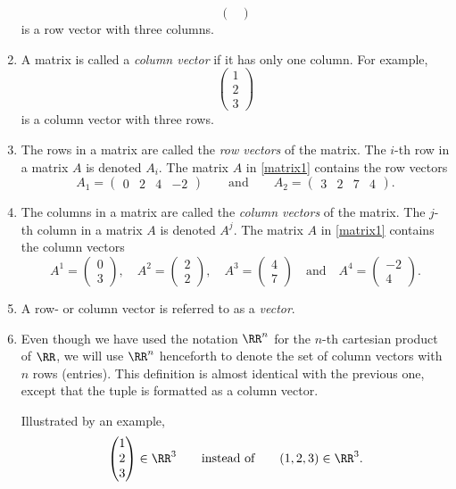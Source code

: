 \documentclass{article}
\begin{document}
\begin{enumerate}
$$\begin{pmatrix}
\end{pmatrix}
$$
is a row vector with three columns.
\item
A matrix is called a \emph{column vector} if it has only one column.
For example, 
$$
\begin{pmatrix}
1\\ 2 \\ 3
\end{pmatrix}
$$
is a column vector with three rows.
\item
  The rows in a matrix are called the  \emph{row vectors} of the matrix.
The $i$-th row in a matrix $A$ is denoted $A_i$.
The matrix $A$ in \eqref{matrix1} contains the row vectors
$$
A_1 = \begin{pmatrix}
0 & 2 & 4 & -2
\end{pmatrix}
\qquad\text{and}\qquad
A_2 = \begin{pmatrix}
3 & 2 & 7 & 4
\end{pmatrix}.
$$
\item
  The columns in a matrix are called the \emph{column vectors} of the matrix.
The $j$-th column in a matrix $A$ is denoted $A^j$.
The matrix $A$ in \eqref{matrix1} contains the column vectors
$$
A^1 = \begin{pmatrix}
0 \\ 3
\end{pmatrix},\quad
A^2 =\begin{pmatrix}
2 \\ 2
\end{pmatrix},\quad
A^3 =\begin{pmatrix}
4 \\ 7
\end{pmatrix}\quad\text{and}\quad
A^4 = \begin{pmatrix}
-2 \\ 4
\end{pmatrix}.
$$
 
\item
  A row- or column vector is referred to as a \emph{vector}.
\item
  Even though we have used the notation $\RR^n$ for the $n$-th cartesian product of $\RR$, we
  will use $\RR^n$ henceforth to denote the set of column vectors with $n$ rows (entries). This
  definition is almost identical with the previous one, except that the tuple is formatted as
  a column vector.

  Illustrated by an example, 
  $$
  \begin{pmatrix} 1 \\ 2 \\ 3 \end{pmatrix} \in \RR^3\qquad\text{instead of}\qquad (1, 2, 3)\in \RR^3.
  $$
\end{enumerate}
\end{document}
